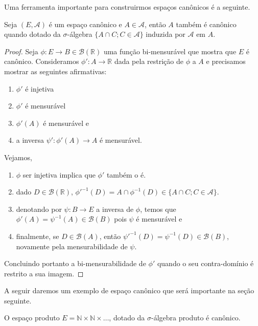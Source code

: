 Uma ferramenta importante para construirmos espaços canônicos é a seguinte.

\begin{lemma}
  \label{l:mensur_de_canonico}
  Seja $(E, \mathcal{A})$ é um espaço canônico e $A \in \mathcal{A}$, então $A$ também é canônico quando dotado da $\sigma$-álgebra $\{A \cap C; C \in \mathcal{A}\}$ induzida por $\mathcal{A}$ em $A$.
\end{lemma}

\begin{proof}
  Seja $\phi: E \to B \in \mathcal{B}(\mathbb{R})$ uma função bi-mensurável que mostra que $E$ é canônico.
  Consideramos $\phi': A \to \mathbb{R}$ dada pela restrição de $\phi$ a $A$ e precisamos mostrar as seguintes afirmativas:
  \begin{enumerate}[\quad a)]
  \item $\phi'$ é injetiva
  \item $\phi'$ é mensurável
  \item $\phi'(A)$ é mensurável e
  \item a inversa $\psi': \phi'(A) \to A$ é mensurável.
  \end{enumerate}
  Vejamos,
  \begin{enumerate}[\quad a)]
  \item $\phi$ ser injetiva implica que $\phi'$ também o é.
  \item dado $D \in \mathcal{B}(\mathbb{R})$, $\phi'^{-1}(D) = A \cap \phi^{-1}(D) \in \{A \cap C; C \in \mathcal{A}\}$.
  \item denotando por $\psi: B \to E$ a inversa de $\phi$, temos que $\phi'(A) = \psi^{-1}(A) \in \mathcal{B}(B)$ pois $\psi$ é mensurável e
  \item finalmente, se $D \in \mathcal{B}(A)$, então $\psi'^{-1}(D) = \psi^{-1}(D) \in \mathcal{B}(B)$, novamente pela mensurabilidade de $\psi$.
  \end{enumerate}
  Concluindo portanto a bi-mensurabilidade de $\phi'$ quando o seu contra-domínio é restrito a sua imagem.
\end{proof}

A seguir daremos um exemplo de espaço canônico que será importante na seção seguinte.

\begin{lemma}
  \label{l:NN_canonico}
  O espaço produto $E = \mathbb{N} \times \mathbb{N} \times \dots$, dotado da $\sigma$-álgebra produto é canônico.
\end{lemma}

